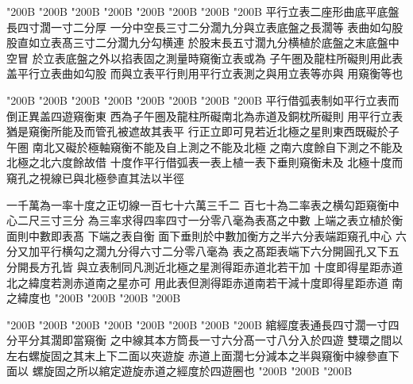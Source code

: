 \begin{正文}
\char"200B\relax{}
\char"200B\relax{}
\char"200B\relax{}
\char"200B\relax{}
\char"200B\relax{}
\char"200B\relax{}
\char"200B\relax{}
\char"200B\relax{}
平行立表二座形曲底平底盤長四寸濶一寸二分厚
一分中空長三寸二分濶九分與立表底盤之長濶等
表曲如勾股股直如立表髙三寸二分濶九分勾横連
於股末長五寸濶九分横植於底盤之末底盤中空冒
於立表底盤之外以掐表固之測量時窺衡立表或為
子午圏及龍柱所礙則用此表盖平行立表曲如勾股
而與立表平行則用平行立表測之與用立表等亦與
用窺衡等也
\par
\end{正文}\clearpage
{}
\begin{正文}
\char"200B\relax{}
\char"200B\relax{}
\char"200B\relax{}
\char"200B\relax{}
\char"200B\relax{}
\char"200B\relax{}
\char"200B\relax{}
\char"200B\relax{}
平行借弧表制如平行立表而倒正異盖四遊窺衡東
西為子午圏及龍柱所礙南北為赤道及銅枕所礙則
用平行立表猶是窺衡所能及而管孔被遮故其表平
行正立即可見若近北極之星則東西既礙於子午圏
南北又礙於極軸窺衡不能及自上測之不能及北極
之南六度餘自下測之不能及北極之北六度餘故借
十度作平行借弧表一表上植一表下垂則窺衡未及
北極十度而窺孔之視線已與北極參直其法以半徑
\par
一千萬為一率十度之正切線一百七十六萬三千二
百七十為二率表之横勾距窺衡中心二尺三寸三分
為三率求得四率四寸一分零八毫為表髙之中數
上端之表立植於衡面則中數即表髙
下端之表自衡
面下垂則於中數加衡方之半六分表端距窺孔中心
六分又加平行横勾之濶九分得六寸二分零八毫為
表之髙距表端下六分開圓孔又下五分開長方孔皆
與立表制同凡測近北極之星測得距赤道北若干加
十度即得星距赤道北之緯度若測赤道南之星亦可
用此表但測得距赤道南若干減十度即得星距赤道
南之緯度也
\char"200B\relax{}
\char"200B\relax{}
\char"200B\relax{}
\char"200B\relax
\par
\end{正文}\clearpage
{}
\begin{正文}
\char"200B\relax{}
\char"200B\relax{}
\char"200B\relax{}
\char"200B\relax{}
\char"200B\relax{}
\char"200B\relax{}
\char"200B\relax{}
\char"200B\relax{}
綰經度表通長四寸濶一寸四分平分其濶即當窺衡
之中線其本方筒長一寸六分髙一寸八分入於四遊
雙環之間以左右螺旋固之其末上下二面以夾遊旋
赤道上面濶七分減本之半與窺衡中線參直下面以
螺旋固之所以綰定遊旋赤道之經度於四遊圈也
\char"200B\relax{}
\char"200B\relax{}
\char"200B\relax
\par
\end{正文}\clearpage

